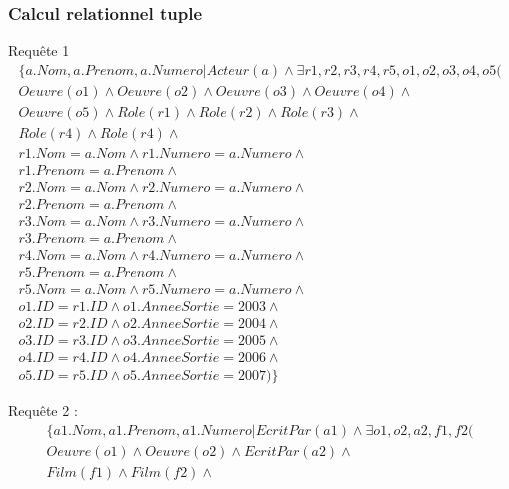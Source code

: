 \documentclass[10pt,a4paper]{article}
\begin{document}
\subsubsection{Calcul relationnel tuple}

\begin{list}{*}{}
\item Requête 1
\noindent
\[\begin{aligned}
      \{ a.Nom, a.Prenom, a.Numero | Acteur(a) \wedge \exists r1, r2, r3, r4, r5, o1, o2, o3, o4, o5 ( \\
       Oeuvre(o1) \wedge Oeuvre(o2) \wedge Oeuvre(o3) \wedge Oeuvre(o4) \wedge \\
       Oeuvre(o5) \wedge Role(r1) \wedge Role(r2) \wedge Role(r3) \wedge \\
       Role(r4) \wedge Role(r4)\wedge \\
       r1.Nom = a.Nom \wedge r1.Numero = a.Numero \wedge \\
       r1.Prenom = a.Prenom \wedge \\
       r2.Nom = a.Nom \wedge r2.Numero = a.Numero \wedge \\
       r2.Prenom = a.Prenom \wedge \\
       r3.Nom = a.Nom \wedge r3.Numero = a.Numero \wedge \\
       r3.Prenom = a.Prenom \wedge \\
       r4.Nom = a.Nom \wedge r4.Numero = a.Numero \wedge \\
       r5.Prenom = a.Prenom \wedge \\
       r5.Nom = a.Nom \wedge r5.Numero = a.Numero \wedge \\
       o1.ID = r1.ID \wedge o1.AnneeSortie = 2003 \wedge \\
       o2.ID = r2.ID \wedge o2.AnneeSortie = 2004 \wedge \\
       o3.ID = r3.ID \wedge o3.AnneeSortie = 2005 \wedge \\
       o4.ID = r4.ID \wedge o4.AnneeSortie = 2006 \wedge \\
       o5.ID = r5.ID \wedge o5.AnneeSortie = 2007) \}
\end{aligned}\]
\item Requête 2 :
\noindent
\[\begin{aligned}
\{ a1.Nom, a1.Prenom, a1.Numero | EcritPar(a1) \wedge \exists o1, o2, a2, f1, f2 ( \\
      Oeuvre(o1) \wedge Oeuvre(o2) \wedge EcritPar(a2) \wedge \\
       Film(f1) \wedge Film(f2) \wedge \\

\end{aligned}\]
\end{list}
\end{document}
